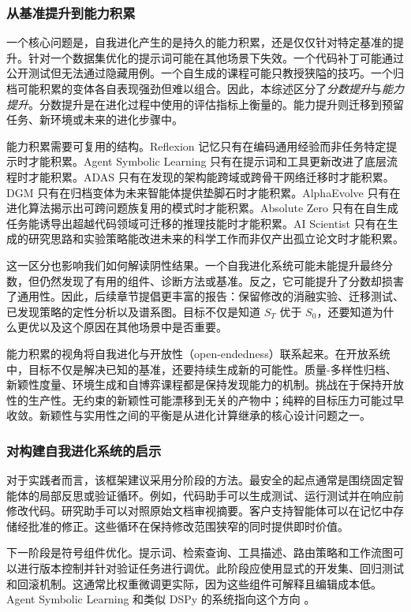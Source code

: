 \subsubsection{从基准提升到能力积累}

一个核心问题是，自我进化产生的是持久的能力积累，还是仅仅针对特定基准的提升。针对一个数据集优化的提示词可能在其他场景下失效。一个代码补丁可能通过公开测试但无法通过隐藏用例。一个自生成的课程可能只教授狭隘的技巧。一个归档可能积累的变体各自表现强劲但难以组合。因此，本综述区分了\emph{分数提升}与\emph{能力提升}。分数提升是在进化过程中使用的评估指标上衡量的。能力提升则迁移到预留任务、新环境或未来的进化步骤中。

能力积累需要可复用的结构。Reflexion 记忆只有在编码通用经验而非任务特定提示时才能积累。Agent Symbolic Learning 只有在提示词和工具更新改进了底层流程时才能积累。ADAS 只有在发现的架构能跨域或跨骨干网络迁移时才能积累。DGM 只有在归档变体为未来智能体提供垫脚石时才能积累。AlphaEvolve 只有在进化算法揭示出可跨问题族复用的模式时才能积累。Absolute Zero 只有在自生成任务能诱导出超越代码领域可迁移的推理技能时才能积累。AI Scientist 只有在生成的研究思路和实验策略能改进未来的科学工作而非仅产出孤立论文时才能积累。

这一区分也影响我们如何解读阴性结果。一个自我进化系统可能未能提升最终分数，但仍然发现了有用的组件、诊断方法或基准。反之，它可能提升了分数却损害了通用性。因此，后续章节提倡更丰富的报告：保留修改的消融实验、迁移测试、已发现策略的定性分析以及谱系图。目标不仅是知道 $S_T$ 优于 $S_0$，还要知道为什么更优以及这个原因在其他场景中是否重要。

能力积累的视角将自我进化与开放性（open-endedness）联系起来。在开放系统中，目标不仅是解决已知的基准，还要持续生成新的可能性。质量-多样性归档、新颖性度量、环境生成和自博弈课程都是保持发现能力的机制。挑战在于保持开放性的生产性。无约束的新颖性可能漂移到无关的产物中；纯粹的目标压力可能过早收敛。新颖性与实用性之间的平衡是从进化计算继承的核心设计问题之一。

\subsubsection{对构建自我进化系统的启示}

对于实践者而言，该框架建议采用分阶段的方法。最安全的起点通常是围绕固定智能体的局部反思或验证循环。例如，代码助手可以生成测试、运行测试并在响应前修改代码。研究助手可以对照原始文档审视摘要。客户支持智能体可以在记忆中存储经批准的修正。这些循环在保持修改范围狭窄的同时提供即时价值。

下一阶段是符号组件优化。提示词、检索查询、工具描述、路由策略和工作流图可以进行版本控制并针对验证任务进行调优。此阶段应使用显式的开发集、回归测试和回滚机制。这通常比权重微调更实际，因为这些组件可解释且编辑成本低。Agent Symbolic Learning 和类似 DSPy 的系统指向这个方向 \cite{agentsymboliclearning2024}。

